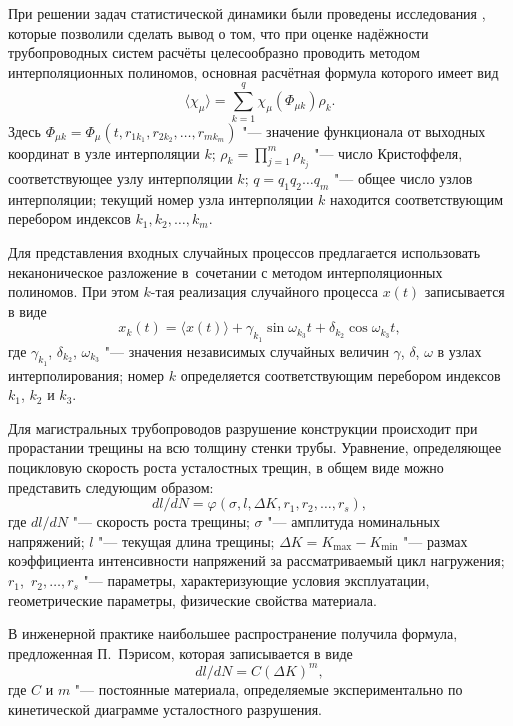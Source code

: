 При решении задач статистической динамики были проведены исследования \cite{tsapurin:bib4,tsapurin:bib5}, которые позволили
сделать вывод о том, что при оценке надёжности трубопроводных
систем расчёты целесообразно проводить методом интерполяционных
полиномов, основная расчётная формула которого имеет вид $$\langle
\chi _\mu \rangle =\sum\limits_{k=1}^q \chi_\mu (\Phi _{\mu k}
)\rho _k.$$ 
Здесь $\Phi _{\mu k} =\Phi _\mu (t,r_{1k_1},r_{2k_2} ,\ldots,r_{mk_m})$ "--- значение функционала от выходных координат
в узле интерполяции $k$; $\rho _k =\prod_{j=1}^m \rho _{k_j }$ "--- число Кристоффеля, соответствующее узлу интерполяции $k$; $q=q_1 q_2 \ldots q_m $ "--- общее число узлов интерполяции;
текущий номер узла интерполяции $k$ находится соответствующим перебором индексов $k_1, k_2, \ldots, k_{m}$.

Для представления входных случайных процессов предлагается использовать неканоническое разложение в~сочетании с методом интерполяционных полиномов. 
При этом $k$-тая реализация случайного процесса $x(t)$ записывается в виде
\begin{equation}
\label{tsapurin:eq2} x_k (t)=\langle x(t)\rangle +\gamma _{k_1}
\sin \omega _{k_3} t+\delta _{k_2} \cos \omega _{k_3} t,
\end{equation}
где $\gamma _{k_1}$, $\delta_{k_2}$, $\omega _{k_3 }$ "---
значения независимых случайных величин $\gamma$, $\delta$,
$\omega$ в узлах интерполирования; номер $k$ определяется
соответствующим перебором индексов $k_1$, $k_2$ и $k_3$.

Для магистральных трубопроводов разрушение конструкции происходит при
прорастании трещины на всю толщину стенки трубы. Уравнение, определяющее
поцикловую скорость роста усталостных трещин, в общем виде можно представить
следующим образом:
\begin{equation}
\label{tsapurin:eq3} {dl}/{dN}=\varphi(\sigma,l,\Delta K,r_1 ,r_2
,\ldots,r_s),
\end{equation}
где $dl/dN$ "--- скорость роста трещины; $\sigma $ "--- амплитуда
номинальных напряжений; $l$ "--- текущая длина трещины; $\Delta
K=K_{\max} - K_{\min} $ "--- размах коэффициента интенсивности
напряжений за рассматриваемый цикл нагружения; \mbox{$r_1$,
$r_2, \ldots, r_s$} "--- параметры, характеризующие условия
эксплуатации, геометрические параметры, физические свойства
материала.

В инженерной практике наибольшее распространение получила формула,
предложенная П.~Пэрисом, которая записывается в виде
$$dl/dN=C(\Delta K)^m,$$ где $C$ и $ m$ "--- постоянные материала,
определяемые экспериментально по кинетической диаграмме
усталостного разрушения.

